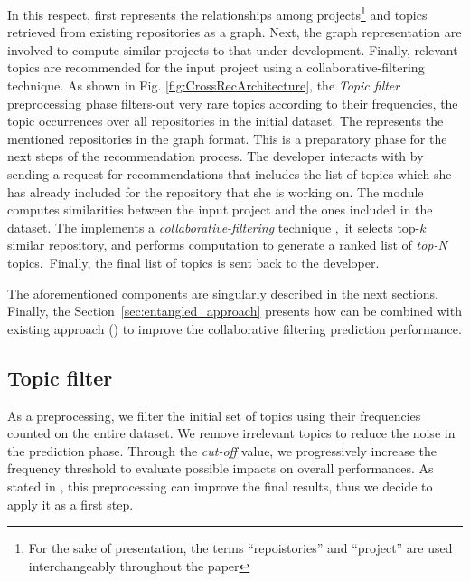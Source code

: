 In this respect, first \TF represents the relationships among projects\footnote{For the sake of presentation, the terms “repoistories” and “project” are used interchangeably throughout the paper} and topics retrieved from existing repositories as a graph. Next, the graph representation are involved to compute similar projects to that under development. Finally, relevant topics are recommended for the input project using a collaborative-filtering technique.
As shown in Fig. \ref{fig:CrossRecArchitecture}, the \emph{Topic filter} preprocessing phase filters-out very rare topics according to their frequencies, \ie the topic occurrences over all repositories in the initial dataset. The  represents the mentioned repositories in the graph format. This is a preparatory phase for the next steps of the recommendation process. 
The developer interacts with \TF by sending a request for recommendations that includes the list of topics which she has already included for the repository that she is working on.
The  module computes similarities between the input project and the ones included in the dataset. The  implements a \emph{collaborative-filtering} technique
\cite{Aggarwal2016,Zhao:2010:UCR:1748610.1749278,NGUYEN2020110460},\ it selects top-$k$ similar repository, and performs computation to generate a ranked list of \emph{top-N}
topics.~Finally, the final list of topics is sent back to the developer.

The aforementioned components are singularly described in the next sections. Finally,  the Section~\ref{sec:entangled_approach} presents how \TF can be combined with existing approach (\ie \MNB)  to improve the collaborative filtering prediction performance.

\subsection{Topic filter}  \label{sec:filter}
As a preprocessing, we filter the initial set of topics using their frequencies counted on the entire \GH dataset. We remove irrelevant topics to reduce the noise in the prediction phase. Through the \emph{cut-off} value, we progressively increase the frequency threshold to evaluate possible impacts on overall performances. As stated in \cite{repo-topix}, this preprocessing can improve the final results, thus we decide to apply it as a first step. 

